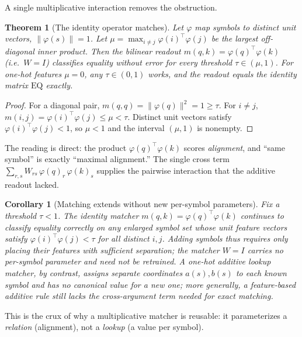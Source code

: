 \documentclass[11pt]{article}
\theoremstyle{plain}
\newtheorem{theorem}{Theorem}
\newtheorem{corollary}{Corollary}
\theoremstyle{definition}
\theoremstyle{remark}
\newcommand{\EQ}{\mathrm{EQ}}
\begin{document}
A single multiplicative interaction removes the obstruction.

\begin{theorem}[The identity operator matches]
\label{thm:sufficiency}
Let $\varphi$ map symbols to distinct unit vectors, $\lVert \varphi(s) \rVert = 1$. Let $\mu = \max_{i \neq j} \varphi(i)^{\top} \varphi(j)$ be the largest off-diagonal inner product. Then the bilinear readout $m(q,k) = \varphi(q)^{\top} \varphi(k)$ (i.e.\ $W = I$) classifies equality without error for every threshold $\tau \in (\mu, 1)$. For one-hot features $\mu = 0$, any $\tau \in (0,1)$ works, and the readout equals the identity matrix $\EQ$ exactly.
\end{theorem}

\begin{proof}
For a diagonal pair, $m(q,q) = \lVert \varphi(q)\rVert^{2} = 1 \geq \tau$. For $i \neq j$, $m(i,j) = \varphi(i)^{\top}\varphi(j) \leq \mu < \tau$. Distinct unit vectors satisfy $\varphi(i)^{\top}\varphi(j) < 1$, so $\mu < 1$ and the interval $(\mu, 1)$ is nonempty.
\end{proof}

The reading is direct: the product $\varphi(q)^{\top}\varphi(k)$ scores \emph{alignment}, and ``same symbol'' is exactly ``maximal alignment.'' The single cross term $\sum_{r,s} W_{rs}\,\varphi(q)_r\,\varphi(k)_s$ supplies the pairwise interaction that the additive readout lacked.

\begin{corollary}[Matching extends without new per-symbol parameters]
\label{cor:generalize}
Fix a threshold $\tau < 1$. The identity matcher $m(q,k) = \varphi(q)^{\top}\varphi(k)$ continues to classify equality correctly on any enlarged symbol set whose unit feature vectors satisfy $\varphi(i)^{\top}\varphi(j) < \tau$ for all distinct $i,j$. Adding symbols thus requires only placing their features with sufficient separation; the matcher $W = I$ carries no per-symbol parameter and need not be retrained. A one-hot additive lookup matcher, by contrast, assigns separate coordinates $a(s), b(s)$ to each known symbol and has no canonical value for a new one; more generally, a feature-based additive rule still lacks the cross-argument term needed for exact matching.
\end{corollary}

This is the crux of why a multiplicative matcher is reusable: it parameterizes a \emph{relation} (alignment), not a \emph{lookup} (a value per symbol).
\end{document}
